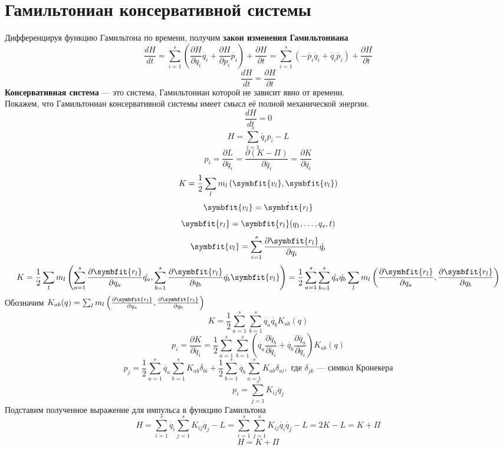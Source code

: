 \documentclass[fleqn,a4paper,12pt,titlepage,finall]{article}
\newcommand\vv[1]{\symbfit{#1}}
\begin{document}
\section{Гамильтониан консервативной системы}
Дифференцируя функцию Гамильтона по времени, получим {\bf закон изменения
Гамильтониана}
\[\frac{dH}{dt} = \sum_{i=1}^s\left(\frac{\partial H}{\partial q_i}\dot{q_i} +
\frac{\partial H}{\partial p_i}\dot{p_i}\right) + \frac{\partial H}{\partial
t} = \sum_{i=1}^s\left(-\dot{p_i}\dot{q_i} + \dot{q_i}\dot{p_i}\right) +
\frac{\partial H}{\partial t}\]
\[\boxed{\frac{dH}{dt} = \frac{\partial H}{\partial t}}\]
{\bf Консервативная система} --- это система, Гамильтониан которой не зависит
явно от времени.\\
Покажем, что Гамильтониан консервативной системы имеет смысл её полной
механической энергии.
\[\frac{dH}{dt} = 0\]
\[H = \sum_{i=1}^s\dot{q_i}p_i - L\]
\[p_i = \frac{\partial L}{\partial \dot{q_i}} = \frac{\partial (K-\Pi)}{\partial
\dot{q_i}} = \frac{\partial K}{\partial \dot{q_i}}\]
\[K = \frac{1}{2}\sum_lm_l\left(\vv{v_l},\vv{v_l}\right)\]
\[\vv{v_l} = \dot{\vv{r_l}}\]
\[\vv{r_l} = \vv{r_l}(q_1,\dots,q_s,t)\]
\[\vv{v_l} = \sum_{i=1}^s\frac{\partial \vv{r_l}}{\partial q_i}\dot{q_i}\]
\[K = \frac{1}{2}\sum_lm_l\left(\sum_{a=1}^s\frac{\partial \vv{r_l}}{\partial
q_a}\dot{q_a}, \sum_{b=1}^s\frac{\partial \vv{r_l}}{\partial
q_b}\dot{q_b}\vv{v_l}\right) = \frac{1}{2}\sum_{a=1}^s\sum_{b=1}^s\dot{q_a}
\dot{q_b}\sum_lm_l \left(\frac{\partial \vv{r_l}}{\partial q_a}, \frac{\partial
\vv{r_l}}{\partial q_b}\right)\]
Обозначим $K_{ab}(q) = \sum_lm_l \left(\frac{\partial \vv{r_l}}{\partial q_a},
\frac{\partial \vv{r_l}}{\partial q_b}\right)$
\[K = \frac{1}{2} \sum_{a=1}^s\sum_{b=1}^s\dot{q_a}\dot{q_b}K_{ab}(q)\]
\[p_i = \frac{\partial K}{\partial \dot{q_i}} = \frac{1}{2}
\sum_{a=1}^s\sum_{b=1}^s\left(\dot{q_a}\frac{\partial
\dot{q_b}}{\partial \dot{q_i}} + \dot{q_b}\frac{\partial \dot{q_a}}{\partial
\dot{q_i}}\right) K_{ab}(q)\]
\[p_j = \frac{1}{2} \sum_{a=1}^s\dot{q_a}\sum_{b=1}^sK_{ab}\delta_{bi} +
\frac{1}{2} \sum_{b=1}^s\dot{q_b}\sum_{a=1}^sK_{ab}\delta_{ai}, \text{ где }
\delta_{jk} \text{ --- символ Кронекера}\]
\[\boxed{p_i = \sum_{j=1}^sK_{ij}\dot{q_j}}\]
Подставим полученное выражение для импульса в функцию Гамильтона
\[H = \sum_{i=1}^s\dot{q_i}\sum_{j=1}^sK_{ij}\dot{q_j} - L = \sum_{i=1}^s
\sum_{j=1}^sK_{ij}\dot{q_i}\dot{q_j}-L = 2K - L = K + \Pi\]
\[\boxed{H = K + \Pi}\]
\end{document}
